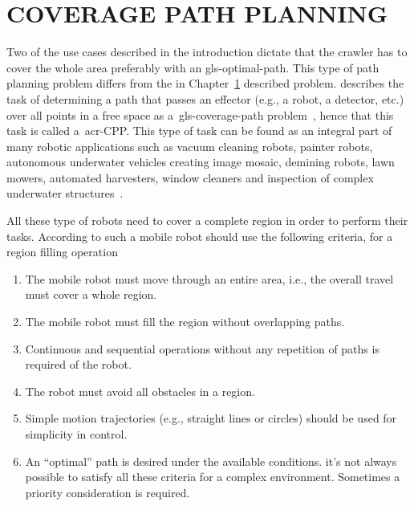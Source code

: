 

\section{COVERAGE PATH PLANNING}\label{sec:cpp}
Two of the use cases described in the introduction dictate that the crawler has to cover the whole area preferably with
an \gls{gls-optimal-path}. This type of path planning problem differs from the in Chapter~\ref{sec:cpp} described
problem. \citeauthor{choset_principles_2005} describes the task of determining a path that passes an effector (e.g., a
robot, a detector, etc.) over all points in a free space as a~\gls{gls-coverage-path}
problem~\cite{choset_principles_2005}, hence that this task is called a~\gls{acr-CPP}. This type of task can be
found as an integral part of many robotic applications such as vacuum cleaning robots, painter robots, autonomous
underwater vehicles creating image mosaic, demining robots, lawn mowers, automated harvesters, window cleaners and
inspection of complex underwater structures~\cite{galceran_survey_2013}.

All these type of robots need to cover a complete region in order to perform their tasks. According to
\citet{cao_region_1988} such a mobile robot should use the following criteria, for a region filling operation
\begin{enumerate}
    \setlength\itemsep{0mm}
    \item The mobile robot must move through an entire area, i.e., the overall travel must cover a whole region.
    \item The mobile robot must fill the region without overlapping paths.
    \item Continuous and sequential operations without any repetition of paths is required of the robot.
    \item The robot must avoid all obstacles in a region.
    \item Simple motion trajectories (e.g., straight lines or circles) should be used for simplicity in control.
    \item An ``optimal'' path is desired under the available conditions. it's not always possible to satisfy all these
    criteria for a complex environment. Sometimes a priority consideration is required.
\end{enumerate}

